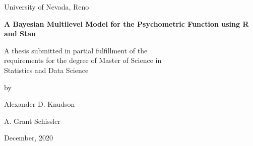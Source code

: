 \documentclass[11pt, oneside, openany]{scrbook}
\begin{document}
\begin{titlepage}
\begin{center}
\vspace*{1in}
University of Nevada, Reno

\vspace{1.5in}
\textbf{A Bayesian Multilevel Model for the Psychometric Function using R and Stan}

\vspace{1in}
A thesis submitted in partial fulfillment of the \\
requirements for the degree of Master of Science in \\
Statistics and Data Science

\vspace{1in}
by

\vspace{1em}
Alexander D. Knudson

\vspace{2em}
A. Grant Schissler

\vspace{3em}
December, 2020

\end{center}
\end{titlepage}
\newpage
\thispagestyle{empty}
\end{document}

